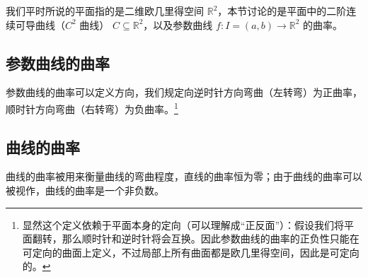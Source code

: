
\begin{issues}
\issueDraft
\end{issues}


我们平时所说的平面指的是二维欧几里得空间 $\mathbb{R}^2$，本节讨论的是平面中的二阶连续可导曲线（$C^2$ 曲线） $C \subseteq \mathbb{R}^2$，以及参数曲线 $f: I = (a, b) \to \mathbb{R}^2$ 的曲率。

\subsection{参数曲线的曲率}

参数曲线的曲率可以定义方向，我们规定向逆时针方向弯曲（左转弯）为正曲率，顺时针方向弯曲（右转弯）为负曲率。\footnote{显然这个定义依赖于平面本身的定向（可以理解成“正反面”）：假设我们将平面翻转，那么顺时针和逆时针将会互换。因此参数曲线的曲率的正负性只能在可定向的曲面上定义，不过局部上所有曲面都是欧几里得空间，因此是可定向的。}

\subsection{曲线的曲率}

曲线的曲率被用来衡量曲线的弯曲程度，直线的曲率恒为零；由于曲线的曲率可以被视作，曲线的曲率是一个非负数。
